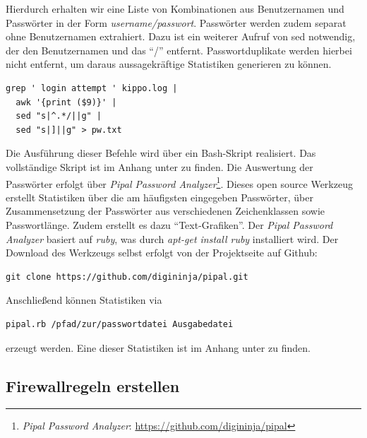 Hierdurch erhalten wir eine Liste von Kombinationen aus Benutzernamen und Passwörter in der Form \textit{username/passwort}. Passwörter werden zudem separat ohne Benutzernamen extrahiert. Dazu ist ein weiterer Aufruf von sed notwendig, der den Benutzernamen und das "`/"' entfernt. Passwortduplikate werden hierbei nicht entfernt, um daraus aussagekräftige Statistiken generieren zu können.

\begin{lstlisting}[style=customc]
grep ' login attempt ' kippo.log |
  awk '{print ($9)}' |
  sed "s|^.*/||g" |
  sed "s|]||g" > pw.txt
\end{lstlisting}

Die Ausführung dieser Befehle wird über ein Bash-Skript realisiert. Das vollständige Skript ist im Anhang unter \textit{} zu finden.
Die Auswertung der Passwörter erfolgt über \textit{Pipal Password Analyzer}\footnote{ \textit{Pipal Password Analyzer}: \url{https://github.com/digininja/pipal}}. Dieses open source Werkzeug erstellt Statistiken über die am häufigsten eingegeben Passwörter, über Zusammensetzung der Passwörter aus verschiedenen Zeichenklassen sowie Passwortlänge. Zudem erstellt es dazu "`Text-Grafiken"'. Der \textit{Pipal Password Analyzer} basiert auf \textit{ruby}, was durch \textit{apt-get install ruby} installiert wird. Der Download des Werkzeugs selbst erfolgt von der Projektseite auf Github:

\begin{lstlisting}[style=customc]
git clone https://github.com/digininja/pipal.git
\end{lstlisting}

Anschließend können Statistiken via

\begin{lstlisting}[style=customc]
pipal.rb /pfad/zur/passwortdatei Ausgabedatei
\end{lstlisting}

erzeugt werden. Eine dieser Statistiken ist im Anhang unter \textit{} zu finden.


\subsection{Firewallregeln erstellen}
\label{subsec:Firewallregeln erstellen}

